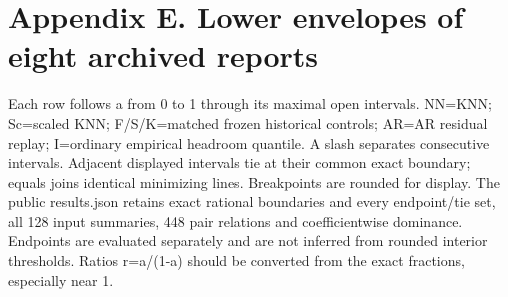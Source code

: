 \documentclass[10pt,a4paper]{article}
\begin{document}
\section*{Appendix E. Lower envelopes of eight archived reports}
Each row follows a from 0 to 1 through its maximal open intervals. NN=KNN; Sc=scaled KNN; F/S/K=matched frozen historical controls; AR=AR residual replay; I=ordinary empirical headroom quantile. A slash separates consecutive intervals. Adjacent displayed intervals tie at their common exact boundary; equals joins identical minimizing lines. Breakpoints are rounded for display. The public results.json retains exact rational boundaries and every endpoint/tie set, all 128 input summaries, 448 pair relations and coefficientwise dominance. Endpoints are evaluated separately and are not inferred from rounded interior thresholds. Ratios r=a/(1-a) should be converted from the exact fractions, especially near 1.
\end{document}
